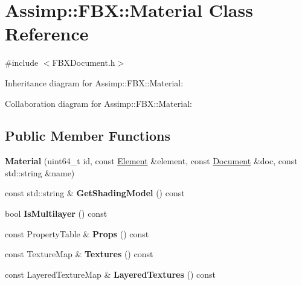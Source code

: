 \hypertarget{class_assimp_1_1_f_b_x_1_1_material}{\section{Assimp\+:\+:F\+B\+X\+:\+:Material Class Reference}
\label{class_assimp_1_1_f_b_x_1_1_material}
}


{\ttfamily \#include $<$F\+B\+X\+Document.\+h$>$}



Inheritance diagram for Assimp\+:\+:F\+B\+X\+:\+:Material\+:


Collaboration diagram for Assimp\+:\+:F\+B\+X\+:\+:Material\+:
\subsection*{Public Member Functions}
\begin{DoxyCompactItemize}
\item 
\hypertarget{class_assimp_1_1_f_b_x_1_1_material_aaa4e105f317420a13ada32ceb18bc7a8}{{\bfseries Material} (uint64\+\_\+t id, const \hyperlink{class_assimp_1_1_f_b_x_1_1_element}{Element} \&element, const \hyperlink{class_assimp_1_1_f_b_x_1_1_document}{Document} \&doc, const std\+::string \&name)}\label{class_assimp_1_1_f_b_x_1_1_material_aaa4e105f317420a13ada32ceb18bc7a8}

\item 
\hypertarget{class_assimp_1_1_f_b_x_1_1_material_a0f2193b10cc9cb6dfe24499d635a4641}{const std\+::string \& {\bfseries Get\+Shading\+Model} () const }\label{class_assimp_1_1_f_b_x_1_1_material_a0f2193b10cc9cb6dfe24499d635a4641}

\item 
\hypertarget{class_assimp_1_1_f_b_x_1_1_material_a64ba4d505f36b1e510f96d871b988bed}{bool {\bfseries Is\+Multilayer} () const }\label{class_assimp_1_1_f_b_x_1_1_material_a64ba4d505f36b1e510f96d871b988bed}

\item 
\hypertarget{class_assimp_1_1_f_b_x_1_1_material_a85be07841a05119e11eabfea26e740bf}{const Property\+Table \& {\bfseries Props} () const }\label{class_assimp_1_1_f_b_x_1_1_material_a85be07841a05119e11eabfea26e740bf}

\item 
\hypertarget{class_assimp_1_1_f_b_x_1_1_material_a22b37603f48199ac45e6c74853f5dd5e}{const Texture\+Map \& {\bfseries Textures} () const }\label{class_assimp_1_1_f_b_x_1_1_material_a22b37603f48199ac45e6c74853f5dd5e}

\item 
\hypertarget{class_assimp_1_1_f_b_x_1_1_material_a0f978f79d5af8c91c73aca5d680df228}{const Layered\+Texture\+Map \& {\bfseries Layered\+Textures} () const }\label{class_assimp_1_1_f_b_x_1_1_material_a0f978f79d5af8c91c73aca5d680df228}

\end{DoxyCompactItemize}
